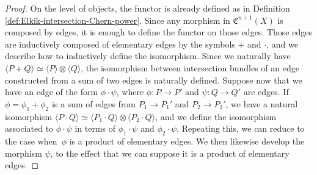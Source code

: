 \documentclass[JEP,XML,SOM,Unicode,published]{cedram}
\theoremstyle{plain}
\theoremstyle{definition}
\newcommand{\Cfrak}{\mathfrak C}
\begin{document}
\begin{proof}
On the level of objects, the functor is already defined as in Definition \ref{def:Elkik-intersection-Chern-power}. Since any morphism in $\Cfrak^{n+1}(X)$ is composed by edges, it is enough to define the functor on those edges. Those edges are inductively composed of elementary edges by the symbols $+$ and $\cdot$, and we describe how to inductively define the isomorphism. Since we naturally have $\langle P + Q \rangle \simeq \langle P \rangle \otimes \langle Q \rangle$, the isomorphism between intersection bundles of an edge constructed from a sum of two edges is naturally defined. Suppose now that we have an edge of the form $\phi \cdot \psi$, where $\phi: P \to P'$ and $\psi: Q \to Q'$ are edges. If $\phi = \phi_1 + \phi_2$ is a sum of edges from $P_1 \to P_1'$ and $P_2 \to P_2'$, we have a natural isomorphism $\langle P \cdot Q\rangle \simeq \langle P_1 \cdot Q \rangle \otimes \langle P_2 \cdot Q \rangle $, and we define the isomorphism associated to $\phi \cdot \psi$ in terms of $\phi_1 \cdot \psi$ and $\phi_2 \cdot \psi$. Repeating this, we can reduce to the case when~$\phi$ is a product of elementary edges. We then likewise develop the morphism $\psi$, to the effect that we can suppose it is a product of elementary edges.


\end{proof}
\end{document}
